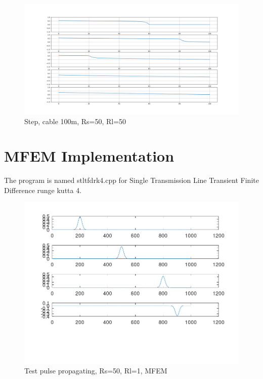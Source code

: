 \documentclass[12pt, letterpaper]{article}
\begin{document}
\begin{figure}[H]
	\centering
	\includegraphics[width=1\textwidth]{step-2.png} %
	\caption{Step, cable 100m, Rs=50, Rl=50}
\end{figure}


\section{MFEM Implementation}

The program is named stltfdrk4.cpp for Single Transmission Line Transient Finite Difference runge kutta 4.\\

\begin{figure}[H]
	\centering
	\includegraphics[width=1\textwidth]{pulse_mfem.png} %
	\caption{Test pulse propagating, Rs=50, Rl=1, MFEM}
\end{figure}
\end{document}
